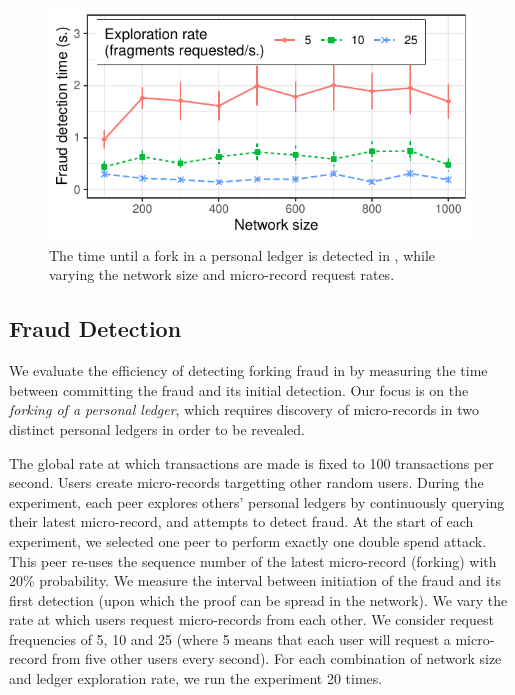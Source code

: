 \begin{figure}[t]
	\centering
	\includegraphics[width=\linewidth]{trustchain/assets/fraud_detection}
	\caption{The time until a fork in a personal ledger is detected in \ModelName{}, while varying the network size and micro-record request rates.}
	\label{fig:fraud_experiment}
\end{figure}

\subsection{Fraud Detection}
\label{sec:fraud_detection_experiment}
We evaluate the efficiency of detecting forking fraud in \ModelName{} by measuring the time between committing the fraud and its initial detection.
Our focus is on the \emph{forking of a personal ledger}, which requires discovery of micro-records in two distinct personal ledgers in order to be revealed.

The global rate at which transactions are made is fixed to 100 transactions per second.
Users create micro-records targetting other random users.
During the experiment, each peer explores others' personal ledgers by continuously querying their latest micro-record, and attempts to detect fraud.
At the start of each experiment, we selected one peer to perform exactly one double spend attack.
This peer re-uses the sequence number of the latest micro-record (forking) with 20\% probability.
We measure the interval between initiation of the fraud and its first detection (upon which the proof can be spread in the network).
We vary the rate at which users request micro-records from each other.
We consider request frequencies of 5, 10 and 25 (where 5 means that each user will request a micro-record from five other users every second).
For each combination of network size and ledger exploration rate, we run the experiment 20 times.

